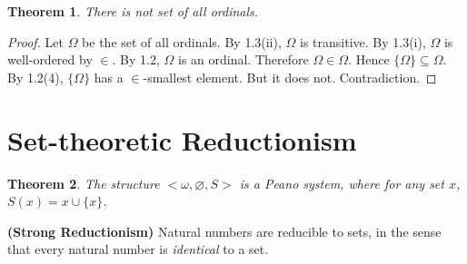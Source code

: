 \documentclass[12pt]{article}
\newtheorem{theo}{Theorem}[section]
\theoremstyle{definition}
\begin{document}
\begin{theo}
There is not set of all ordinals.
\end{theo}

\begin{proof}
Let $\Omega$ be the set of all ordinals. By 1.3(ii), $\Omega$ is transitive. By 1.3(i), $\Omega$ is well-ordered by $\in$. By 1.2, $\Omega$ is an ordinal.
Therefore $\Omega \in \Omega$. Hence $\{\Omega\} \subseteq \Omega$. By 1.2(4), $\{ \Omega \}$ has a $\in$-smallest element. But it does not. Contradiction.
\end{proof}

\section{Set-theoretic Reductionism}


\begin{theo}
The structure $<\omega, \varnothing, S>$ is a Peano system, where for any set $x$, $S(x) = x \cup \{x\}$.
\end{theo}

\noindent
\textbf{(Strong Reductionism)} Natural numbers are reducible to sets, in the sense that every natural number is \textit{identical} to a set.
\end{document}
